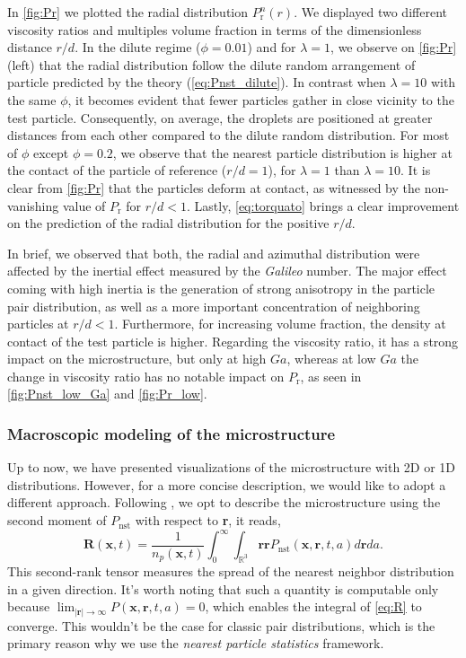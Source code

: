 In \ref{fig:Pr}  we plotted the radial distribution $P_\text{r}^n(r)$. %
We displayed two different viscosity ratios and multiples volume fraction in terms of the dimensionless distance $r/d$. 
In the dilute regime ($\phi = 0.01$) and for $\lambda=1$, we observe on \ref{fig:Pr} (left) that the radial distribution follow the dilute random arrangement of particle predicted by the theory (\ref{eq:Pnst_dilute}). 
In contrast when $\lambda = 10$ with the same $\phi$, it becomes evident that fewer particles gather in close vicinity to the test particle. Consequently, on average, the droplets are positioned at greater distances from each other compared to the dilute random distribution. 
For most of $\phi$ except $\phi=0.2$, we observe that the nearest particle distribution is higher at the contact of the particle of reference ($r/d = 1$), for $\lambda = 1$ than $\lambda = 10$. 
It is clear from \ref{fig:Pr} that the particles deform at contact, as witnessed by the non-vanishing value of $P_\text{r}$ for $r/d<1$.
Lastly, \ref{eq:torquato} brings a clear improvement on the prediction of the radial distribution for the positive $r/d$. 


In brief, we observed that both, the radial and azimuthal distribution were affected by the inertial effect measured by the \textit{Galileo} number. 
The major effect coming with high inertia is the generation of strong anisotropy in the particle pair distribution, as well as a more important concentration of neighboring particles at $r/d < 1$. 
Furthermore, for increasing volume fraction, the density at contact of the test particle is higher. 
Regarding the viscosity ratio, it has a strong impact on the microstructure, but only at high $Ga$, whereas at low $Ga$ the change in viscosity ratio has no notable impact on $P_\text{r}$, as seen in \ref{fig:Pnst_low_Ga} and \ref{fig:Pr_low}. 

\subsubsection*{Macroscopic modeling of the microstructure}
Up to now, we have presented visualizations of the microstructure with 2D or 1D distributions. 
However, for a more concise description, we would like to adopt a different approach. 
Following \citet{zhang2023evolution}, we opt to describe the microstructure using the second moment of $P_\text{nst}$ with respect to \textbf{r}, it reads,
\begin{equation}
    \textbf{R}(\textbf{x},t) =\frac{1}{n_p(\textbf{x},t)} 
    \int_0^\infty 
    \int_{\mathbb{R}^3} \textbf{rr} P_\text{nst}(\textbf{x},\textbf{r},t,a) d\textbf{r} da.
    \label{eq:R}
\end{equation}
This second-rank tensor measures the spread of the nearest neighbor distribution in a given direction. 
It's worth noting that such a quantity is computable only because $\lim_{|\textbf{r}|\to \infty} P(\textbf{x},\textbf{r},t,a) = 0$, which enables the integral of \ref{eq:R} to converge. 
This wouldn't be the case for classic pair distributions, which is the primary reason why we use the \textit{nearest particle statistics} framework. 


